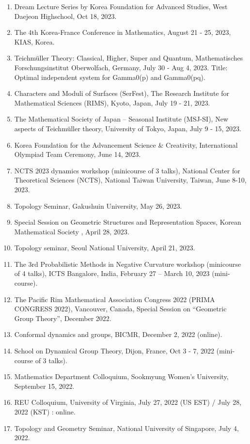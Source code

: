 \documentclass[11pt,a4paper]{article}
\begin{document}
\begin{enumerate}[leftmargin=1.5em, label=\arabic*.]
\item Dream Lecture Series by Korea Foundation for Advanced Studies, West Daejeon Highschool, Oct 18, 2023.
\item The 4th Korea-France Conference in Mathematics, August 21 - 25, 2023, KIAS, Korea.
\item Teichmüller Theory: Classical, Higher, Super and Quantum, Mathematisches Forschungsinstitut Oberwolfach, Germany, July 30 - Aug 4, 2023. Title: Optimal independent system for Gamma0(p) and Gamma0(pq).
\item Characters and Moduli of Surfaces (SerFest), The Research Institute for Mathematical Sciences (RIMS), Kyoto, Japan, July 19 - 21, 2023.
\item The Mathematical Society of Japan -- Seasonal Institute (MSJ-SI), New aspects of Teichmüller theory, University of Tokyo, Japan, July 9 - 15, 2023.
\item Korea Foundation for the Advancement Science \& Creativity, International Olympiad Team Ceremony, June 14, 2023.
\item NCTS 2023 dynamics workshop (minicourse of 3 talks), National Center for Theoretical Sciences (NCTS), National Taiwan University, Taiwan, June 8-10, 2023.
\item Topology Seminar, Gakushuin University, May 26, 2023.
\item Special Session on Geometric Structures and Representation Spaces, Korean Mathematical Society , April 28, 2023.
\item Topology seminar, Seoul National University, April 21, 2023.
\item The 3rd Probabilistic Methods in Negative Curvature workshop  (minicourse of 4 talks), ICTS Bangalore, India, February 27 -- March 10, 2023 (mini-course).
\item The Pacific Rim Mathematical Association Congress 2022 (PRIMA CONGRESS 2022), Vancouver, Canada, Special Session on ``Geometric Group Theory'', December 2022.
\item Conformal dynamics and groups, BICMR, December 2, 2022 (online).
\item School on Dynamical Group Theory, Dijon, France, Oct 3 - 7, 2022 (mini-course of 3 talks).
\item Mathematics Department Colloquium, Sookmyung Women's University, September 15, 2022.
\item REU Colloquium, University of Virginia, July 27, 2022 (US EST) / July 28, 2022 (KST) : online.
\item Topology and Geometry Seminar, National University of Singapore, July 4, 2022.

\end{enumerate}
\end{document}
